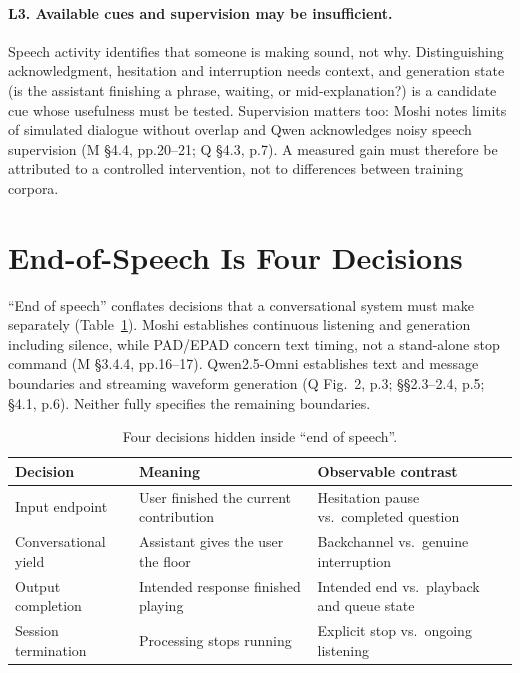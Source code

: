 \documentclass[11pt,a4paper,twocolumn]{article}
\newcommand{\M}{\textsc{M}}
\newcommand{\Q}{\textsc{Q}}
\begin{document}
\paragraph{L3. Available cues and supervision may be insufficient.} Speech activity identifies that someone is making sound, not why. Distinguishing acknowledgment, hesitation and interruption needs context, and generation state (is the assistant finishing a phrase, waiting, or mid-explanation?) is a candidate cue whose usefulness must be tested. Supervision matters too: Moshi notes limits of simulated dialogue without overlap and Qwen acknowledges noisy speech supervision (\M{} \S4.4, pp.20--21; \Q{} \S4.3, p.7). A measured gain must therefore be attributed to a controlled intervention, not to differences between training corpora.

\section{End-of-Speech Is Four Decisions}
\label{sec:eos}

``End of speech'' conflates decisions that a conversational system must make separately (Table~\ref{tab:eos}). Moshi establishes continuous listening and generation including silence, while PAD/EPAD concern text timing, not a stand-alone stop command (\M{} \S3.4.4, pp.16--17). Qwen2.5-Omni establishes text and message boundaries and streaming waveform generation (\Q{} Fig.~2, p.3; \S\S2.3--2.4, p.5; \S4.1, p.6). Neither fully specifies the remaining boundaries.

\begin{table}[t]
\centering\footnotesize
\begin{tabular}{@{}p{1.75cm}p{2.7cm}p{2.7cm}@{}}
\toprule
\textbf{Decision} & \textbf{Meaning} & \textbf{Observable contrast} \\
\midrule
Input endpoint & User finished the current contribution & Hesitation pause vs.\ completed question \\
Conversational yield & Assistant gives the user the floor & Backchannel vs.\ genuine interruption \\
Output completion & Intended response finished playing & Intended end vs.\ playback and queue state \\
Session termination & Processing stops running & Explicit stop vs.\ ongoing listening \\
\bottomrule
\end{tabular}
\caption{Four decisions hidden inside ``end of speech''.}
\label{tab:eos}
\end{table}
\end{document}
